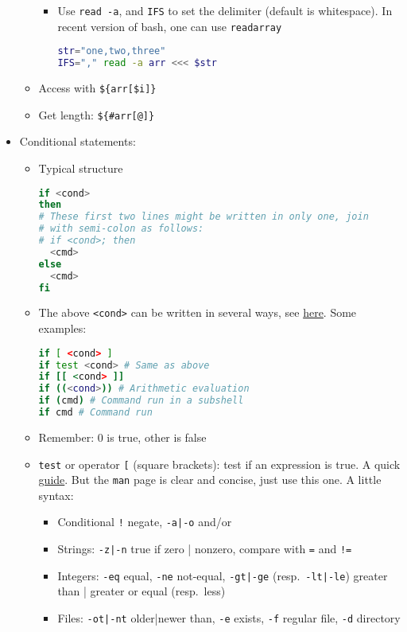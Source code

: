 \documentclass[a4paper,12pt,%
              final%
              ]{article}
\begin{document}
\begin{itemize}
\begin{itemize}
\begin{itemize}
          \item Use \verb|read -a|, and \verb|IFS| to set the delimiter (default is whitespace). In recent version of bash, one can use \verb|readarray|
\begin{lstlisting}[language=bash]
str="one,two,three"
IFS="," read -a arr <<< $str
\end{lstlisting}
        \end{itemize}
      \item Access with \verb|${arr[$i]}|
      \item Get length: \verb|${#arr[@]}|
    \end{itemize}
  \item Conditional statements:
    \begin{itemize}
      \item Typical structure
\begin{lstlisting}[language=bash]
if <cond>
then
# These first two lines might be written in only one, join
# with semi-colon as follows:
# if <cond>; then
  <cmd>
else
  <cmd>
fi
\end{lstlisting}
      \item The above \verb|<cond>| can be written in several ways, see \href{https://unix.stackexchange.com/questions/306111/what-is-the-difference-between-the-bash-operators-vs-vs-vs}{here}. Some examples:
\begin{lstlisting}[language=bash]
if [ <cond> ]
if test <cond> # Same as above
if [[ <cond> ]]
if ((<cond>)) # Arithmetic evaluation
if (cmd) # Command run in a subshell
if cmd # Command run
\end{lstlisting}
      \item Remember: 0 is true, other is false
      \item \texttt{test} or operator \verb|[| (square brackets): test if an expression is true. A quick \href{https://www.computerhope.com/unix/test.htm}{guide}. But the \texttt{man} page is clear and concise, just use this one. A little syntax:
        \begin{itemize}
          \item Conditional \verb|!| negate, \verb!-a|-o! and/or
          \item Strings: \verb!-z|-n! true if zero | nonzero, compare with \verb|=| and \verb|!=|
          \item Integers: \verb|-eq| equal, \verb|-ne| not-equal, \verb!-gt|-ge! (resp.\ \verb!-lt|-le!) greater than | greater or equal (resp.\ less)
          \item Files: \verb!-ot|-nt! older|newer than, \verb|-e| exists, \verb|-f| regular file, \verb|-d| directory

\end{itemize}
\end{itemize}
\end{itemize}
\end{document}

